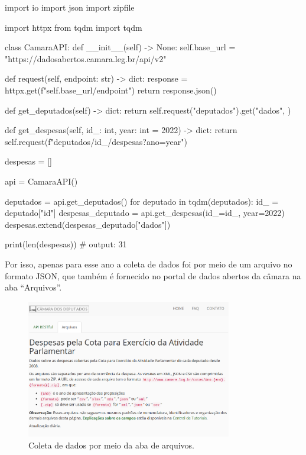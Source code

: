 \documentclass[12pt, a4paper]{article}
\begin{document}
\begin{python}
import io
import json
import zipfile

import httpx
from tqdm import tqdm

class CamaraAPI:
	def __init__(self) -> None:
		self.base_url = "https://dadosabertos.camara.leg.br/api/v2"
	
	def request(self, endpoint: str) -> dict:
		response = httpx.get(f"{self.base_url}/{endpoint}")
		return response.json()
	
	def get_deputados(self) -> dict:
		return self.request("deputados").get("dados", {})
	
	def get_despesas(self, id_: int, year: int = 2022) -> dict:
		return self.request(f"deputados/{id_}/despesas?ano={year}")

despesas = []

api = CamaraAPI()

deputados = api.get_deputados()
for deputado in tqdm(deputados):
	id_ = deputado["id"]
	despesas_deputado = api.get_despesas(id_=id_, year=2022)
	despesas.extend(despesas_deputado["dados"])

print(len(despesas))  # output: 31
\end{python}

Por isso, apenas para esse ano a coleta de dados foi por meio de um arquivo no formato JSON, que também é fornecido no portal de dados abertos da câmara na aba “Arquivos”.

\begin{figure}[!htbp]
    \centering
    \includegraphics[width=0.8\textwidth]{assets/1_arquivos.png}
    \caption{Coleta de dados por meio da aba de arquivos.}
    \label{fig:arquivo_json}
\end{figure}
\end{document}

